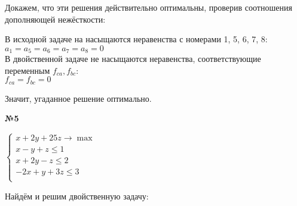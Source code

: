 \documentclass{article}
\newenvironment{task}{\begin{center}\fontsize{14}{14}\selectfont\bf}{\rm\fontsize{12}{12}\selectfont\end{center}}
\begin{document}
	Докажем, что эти решения действительно оптимальны, проверив соотношения дополняющей нежёсткости:
	\begin{center}
		В исходной задаче на насыщаются неравенства с номерами 1, 5, 6, 7, 8:\\
		$a_1 = a_5 = a_6 = a_7 = a_8 = 0$ \\
		В двойственной задаче не насыщаются неравенства, соответствующие переменным $f_{ca}, f_{bc}$:\\
		$f_{ca} = f_{bc} = 0$
	\end{center}
	Значит, угаданное решение оптимально.

	
	\begin{task} 
		№5
	\end{task}
	\begin{center}
			$\begin{cases}
			x+2y+25z \rightarrow \max \\
			x-y+z \leq 1 \\
			x+2y-z \leq 2 \\
			-2x+y+3z \leq 3 \\
			\end{cases}$ 
	\end{center}
	Найдём и решим двойственную задачу:
\end{document}
